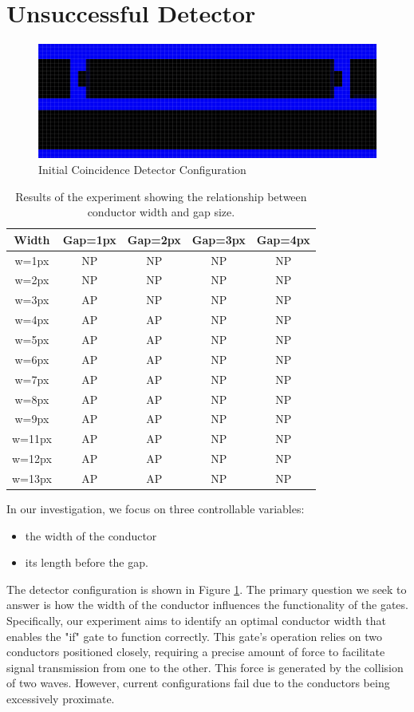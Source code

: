 \section{Unsuccessful Detector}\label{unsuccessful-detector}
\begin{figure}
    \centering
    \includegraphics[width=0.75\linewidth]{image7.png}
    \caption{Initial Coincidence Detector Configuration}
    \label{fig:unsuccessful-config-and-gate}
\end{figure}
\begin{table}[h]
\centering
\begin{tabular}{|c|c|c|c|c|}
\hline
Width & Gap=1px & Gap=2px & Gap=3px & Gap=4px \\ \hline
w=1px & NP & NP & NP & NP \\ \hline
w=2px & NP & NP & NP & NP \\ \hline
w=3px & AP & NP & NP & NP \\ \hline
w=4px & AP & AP & NP & NP \\ \hline
w=5px & AP & AP & NP & NP \\ \hline
w=6px & AP & AP & NP & NP \\ \hline
w=7px & AP & AP & NP & NP \\ \hline
w=8px & AP & AP & NP & NP \\ \hline
w=9px & AP & AP & NP & NP \\ \hline
w=11px & AP & AP & NP & NP \\ \hline
w=12px & AP & AP & NP & NP \\ \hline
w=13px & AP & AP & NP & NP \\ \hline
\end{tabular}
\caption{Results of the experiment showing the relationship between conductor width and gap size.}
\label{table:experiment-results}
\end{table}
In our investigation, we focus on three controllable variables: 
\begin{itemize}
    \item the width of the conductor
    \item its length before the gap.
\end{itemize}
The detector configuration is shown in Figure \ref{fig:unsuccessful-config-and-gate}.
The primary question we seek to answer is how the width of the conductor influences the functionality of the gates. Specifically, our experiment aims to identify an optimal conductor width that enables the "if" gate to function correctly. This gate's operation relies on two conductors positioned closely, requiring a precise amount of force to facilitate signal transmission from one to the other. This force is generated by the collision of two waves. However, current configurations fail due to the conductors being excessively proximate.

